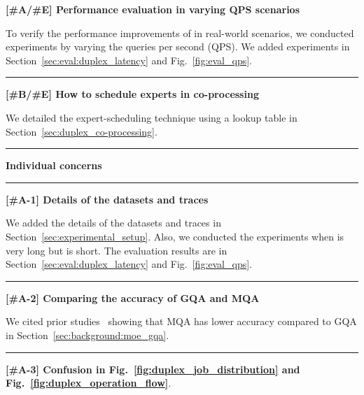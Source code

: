 \noindent
\textbf{[\#A/\#E] Performance evaluation in varying QPS scenarios}
%

To verify the performance improvements of \duplex in real-world scenarios, we conducted experiments by varying the queries per second (QPS).
We added experiments in Section~\ref{sec:eval:duplex_latency} and Fig.~\ref{fig:eval_qps}.



\noindent
\rule[0.5ex]{8.8cm}{0.5pt}

\noindent
\textbf{[\#B/\#E] How to schedule experts in co-processing}
%

We detailed the expert-scheduling technique using a lookup table in Section~\ref{sec:duplex_co-processing}.


\noindent
\rule[0.5ex]{8.8cm}{2pt}

\begin{center}
    \large \textbf{Individual concerns}
\end{center}

\noindent
\rule[0.5ex]{8.8cm}{2pt}


\noindent
\textbf{[\#A-1] Details of the datasets and traces}
%

We added the details of the datasets and traces in Section~\ref{sec:experimental_setup}.
Also, we conducted the experiments when \lin is very long but \lout is short.
The evaluation results are in Section~\ref{sec:eval:duplex_latency} and Fig.~\ref{fig:eval_qps}.

\noindent
\rule[0.5ex]{8.8cm}{0.5pt}



\noindent
\textbf{[\#A-2] Comparing the accuracy of GQA and MQA}
%

We cited prior studies~\cite{2023-arxiv-gqa, 2023-arxiv-llama2} showing that MQA has lower accuracy compared to GQA in Section~\ref{sec:background:moe_gqa}.


\noindent
\rule[0.5ex]{8.8cm}{0.5pt}

\noindent
\textbf{[\#A-3] Confusion in Fig.~\ref{fig:duplex_job_distribution} and Fig.~\ref{fig:duplex_operation_flow}}.

